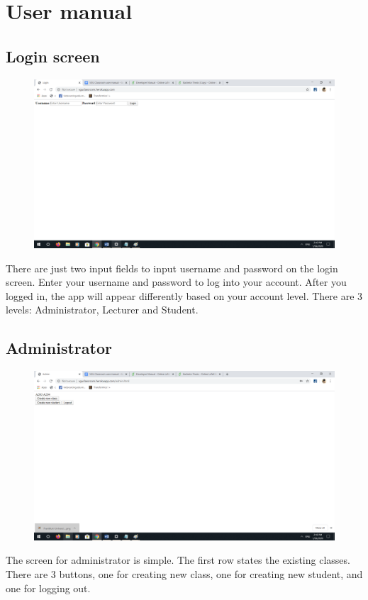 \documentclass[a4paper, 11pt,openany]{book} %
\begin{document}
\chapter{User manual}
\section{Login screen}
\begin{figure}[H]
    \centering
    \includegraphics[width=\textwidth,height=\textheight,keepaspectratio]{images/1.png}
\end{figure}
There are just two input fields to input username and password on the login screen. Enter your username and password to log into your account. After you logged in, the app will appear differently based on your account level. There are 3 levels: Administrator, Lecturer and Student.
\section{Administrator}
\begin{figure}[H]
    \centering
    \includegraphics[width=\textwidth,height=\textheight,keepaspectratio]{images/2.png}
\end{figure}
The screen for administrator is simple. The first row states the existing classes. There are  3 buttons, one for creating new class, one for creating new student, and one for logging out.
\end{document}

